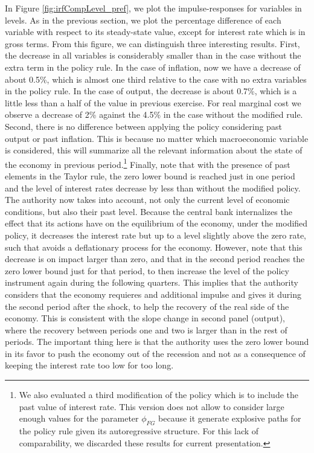 \documentclass[11pt]{article}
\numberwithin{equation}{section}
\begin{document}
In Figure \ref{fig:irfCompLevel_pref}, we plot the impulse-responses for variables in levels. As in the previous section, we plot the percentage difference of each variable with respect to its steady-state value, except for interest rate which is in gross terms. From this figure, we can distinguish three interesting results. First, the decrease in all variables is considerably smaller than in the case without the extra term in the policy rule. In the case of inflation, now we have a decrease of about 0.5\%, which is almost one third relative to the case with no extra variables in the policy rule. In the case of output, the decrease is about 0.7\%, which is a little less than a half of the value in previous exercise. For real marginal cost we observe a decrease of 2\% against the 4.5\% in the case without the modified rule. Second, there is no difference between applying the policy considering past output or past inflation. This is because no matter which macroeconomic variable is considered, this will summarize all the relevant information about the state of the economy in previous period.\footnote{We also evaluated a third modification of the policy which is to include the past value of interest rate. This version does not allow to consider large enough values for the parameter $\phi_{FG}$ because it generate explosive paths for the policy rule given its autoregressive structure. For this lack of comparability, we discarded these results for current presentation.} Finally, note that with the presence of past elements in the Taylor rule, the zero lower bound is reached just in one period and the level of interest rates decrease by less than without the modified policy. The authority now takes into account, not only the current level of economic conditions, but also their past level. Because the central bank internalizes the effect that its actions have on the equilibrium of the economy, under the modified policy, it decreases the interest rate but up to a level slightly above the zero rate, such that avoids a deflationary process for the economy. However, note that this decrease is on impact larger than zero, and that in the second period reaches the zero lower bound just for that period, to then increase the level of the policy instrument again during the following quarters. This implies that the authority considers that the economy requieres and additional impulse and gives it during the second period after the shock, to help the recovery of the real side of the economy. This is consistent with the slope change in second panel (output), where the recovery between periods one and two is larger than in the rest of periods. The important thing here is that the authority uses the zero lower bound in its favor to push the economy out of the recession and not as a consequence of keeping the interest rate too low for too long.
\end{document}
